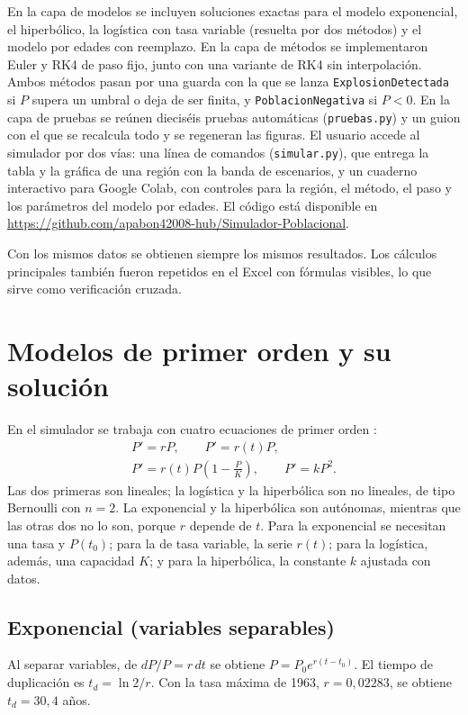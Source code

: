 \documentclass[10pt,twocolumn,letterpaper]{article}
\begin{document}
En la capa de modelos se incluyen soluciones exactas para el modelo exponencial, el hiperbólico, la logística con tasa variable (resuelta por dos métodos) y el modelo por edades con reemplazo. En la capa de métodos se implementaron Euler y RK4 de paso fijo, junto con una variante de RK4 sin interpolación. Ambos métodos pasan por una guarda con la que se lanza \texttt{ExplosionDetectada} si $P$ supera un umbral o deja de ser finita, y \texttt{PoblacionNegativa} si $P<0$. En la capa de pruebas se reúnen dieciséis pruebas automáticas (\texttt{pruebas.py}) y un guion con el que se recalcula todo y se regeneran las figuras. El usuario accede al simulador por dos vías: una línea de comandos (\texttt{simular.py}), que entrega la tabla y la gráfica de una región con la banda de escenarios, y un cuaderno interactivo para Google Colab, con controles para la región, el método, el paso y los parámetros del modelo por edades. El código está disponible en \url{https://github.com/apabon42008-hub/Simulador-Poblacional}.

Con los mismos datos se obtienen siempre los mismos resultados. Los cálculos principales también fueron repetidos en el Excel con fórmulas visibles, lo que sirve como verificación cruzada.

\section{Modelos de primer orden y su solución}
En el simulador se trabaja con cuatro ecuaciones de primer orden \cite{zill,boyce}:
\begin{gather}
P'=rP,\qquad P'=r(t)P,\label{eq:m1}\\
P'=r(t)P\left(1-\tfrac{P}{K}\right),\qquad P'=kP^2.\label{eq:m2}
\end{gather}
Las dos primeras son lineales; la logística y la hiperbólica son no lineales, de tipo Bernoulli con $n=2$. La exponencial y la hiperbólica son autónomas, mientras que las otras dos no lo son, porque $r$ depende de $t$. Para la exponencial se necesitan una tasa y $P(t_0)$; para la de tasa variable, la serie $r(t)$; para la logística, además, una capacidad $K$; y para la hiperbólica, la constante $k$ ajustada con datos.

\subsection{Exponencial (variables separables)}
Al separar variables, de $dP/P=r\,dt$ se obtiene $P=P_0e^{r(t-t_0)}$. El tiempo de duplicación es $t_d=\ln 2/r$. Con la tasa máxima de 1963, $r=0{,}02283$, se obtiene $t_d=30{,}4$ años.
\end{document}
